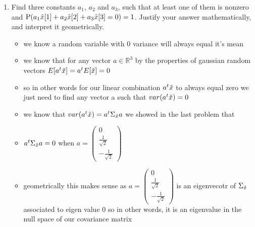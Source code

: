 \documentclass[12pt,twoside]{article}
\begin{document}
\begin{enumerate}
\begin{enumerate}
\begin{itemize}
\end{itemize}
\item Find three constants $a_1$, $a_2$ and $a_3$, such that at least one of them is nonzero and $\mathrm{P}(a_1 \tilde{  x }[1]+ a_2 \tilde{  x }[2] + a_3 \tilde{  x }[3] = 0) = 1$. Justify your answer mathematically, and interpret it geometrically.  
\begin{itemize}
  \color{blue}
  \item we know a random variable with 0 variance will always equal it's mean 
  \item we know that for any vector $a\in \mathbb{R}^{3}$ by the properties of gaussian random vectors $E[a^t\Tilde{x}]=a^tE[\tilde{x}]=0$
  \item so in other words for our linear combination $a^t\Tilde{x}$ to always equal zero we just need to find any vector a such that $var(a^t\Tilde{x})=0$
  \item we know that $var(a^{t}\Tilde{x})=a^{t}\Sigma_{\Tilde{x}}a$ we showed in the last problem that 
  \item $a^{t}\Sigma_{\Tilde{x}}a=0$ when $a=\begin{pmatrix}
    0\\\frac{1}{\sqrt{2}}\\-\frac{1}{\sqrt{2}}
  \end{pmatrix}$ 
  \item geometrically this makes sense as  $a=\begin{pmatrix}
    0\\\frac{1}{\sqrt{2}}\\-\frac{1}{\sqrt{2}}
  \end{pmatrix}$  is an eigenvecotr of $\Sigma_{\Tilde{x}}$ associated to eigen value 0 so in other words, it is an eigenvalue in the null space of our covariance matrix 
\end{itemize}


\end{enumerate}
\end{enumerate}
\end{document}
